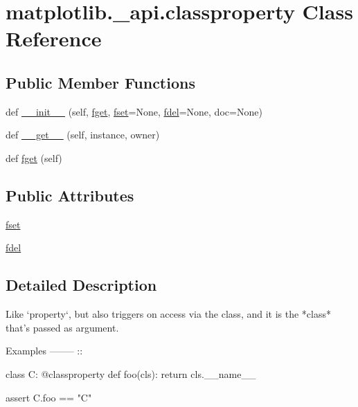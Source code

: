 \hypertarget{classmatplotlib_1_1__api_1_1classproperty}{}\section{matplotlib.\+\_\+api.\+classproperty Class Reference}
\label{classmatplotlib_1_1__api_1_1classproperty}
\subsection*{Public Member Functions}
\begin{DoxyCompactItemize}
\item 
def \hyperlink{classmatplotlib_1_1__api_1_1classproperty_a4bd63acd810287101a7bdb51a20fb43c}{\+\_\+\+\_\+init\+\_\+\+\_\+} (self, \hyperlink{classmatplotlib_1_1__api_1_1classproperty_a43fd0646e54553708a4ccd46472be39b}{fget}, \hyperlink{classmatplotlib_1_1__api_1_1classproperty_aa9c4bf69ae3191f365a4a42a789a3748}{fset}=None, \hyperlink{classmatplotlib_1_1__api_1_1classproperty_ad199b89e47bd5ce0dac26c9ef5424e0f}{fdel}=None, doc=None)
\item 
def \hyperlink{classmatplotlib_1_1__api_1_1classproperty_aaed737760f940a6f630c14e923880661}{\+\_\+\+\_\+get\+\_\+\+\_\+} (self, instance, owner)
\item 
def \hyperlink{classmatplotlib_1_1__api_1_1classproperty_a43fd0646e54553708a4ccd46472be39b}{fget} (self)
\end{DoxyCompactItemize}
\subsection*{Public Attributes}
\begin{DoxyCompactItemize}
\item 
\hyperlink{classmatplotlib_1_1__api_1_1classproperty_aa9c4bf69ae3191f365a4a42a789a3748}{fset}
\item 
\hyperlink{classmatplotlib_1_1__api_1_1classproperty_ad199b89e47bd5ce0dac26c9ef5424e0f}{fdel}
\end{DoxyCompactItemize}


\subsection{Detailed Description}
\begin{DoxyVerb}Like `property`, but also triggers on access via the class, and it is the
*class* that's passed as argument.

Examples
--------
::

    class C:
        @classproperty
        def foo(cls):
            return cls.__name__

    assert C.foo == "C"
\end{DoxyVerb}
 

